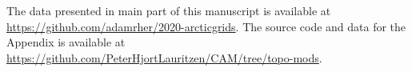 \documentclass[draft]{agujournal2019}
\begin{document}
The data presented in main part of this manuscript is available at {\url{https://github.com/adamrher/2020-arcticgrids}}. The source code and data for the Appendix is available at {\url{https://github.com/PeterHjortLauritzen/CAM/tree/topo-mods}}.


%
%

%



%
%
%
%
%
\end{document}
